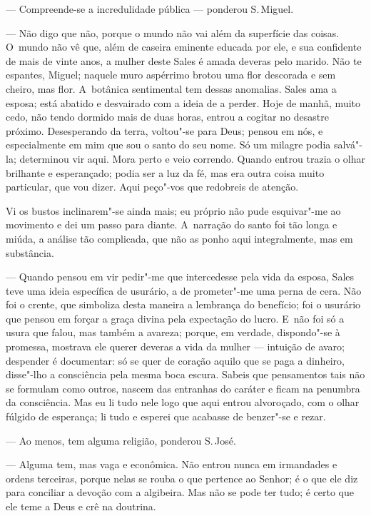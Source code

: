 \begin{linenumbers}
--- Compreende-se a incredulidade pública --- ponderou S.\,Miguel.

--- Não digo que não, porque o mundo não vai além da superfície das
coisas. O~mundo não vê que, além de caseira eminente educada por ele, e
sua confidente de mais de vinte anos, a mulher deste Sales é amada
deveras pelo marido. Não te espantes, Miguel; naquele muro aspérrimo
brotou uma flor descorada e sem cheiro, mas flor. A~botânica sentimental
tem dessas anomalias. Sales ama a esposa; está abatido e desvairado com
a ideia de a perder. Hoje de manhã, muito cedo, não tendo dormido mais
de duas horas, entrou a cogitar no desastre próximo. Desesperando da
terra, voltou"-se para Deus; pensou em nós, e especialmente em mim que
sou o santo do seu nome. Só um milagre podia salvá"-la; determinou vir
aqui. Mora perto e veio correndo. Quando entrou trazia o olhar brilhante
e esperançado; podia ser a luz da fé, mas era outra coisa muito
particular, que vou dizer. Aqui peço"-vos que redobreis de atenção.

Vi os bustos inclinarem"-se ainda mais; eu próprio não pude esquivar"-me
ao movimento e dei um passo para diante. A~narração do santo foi tão
longa e miúda, a análise tão complicada, que não as ponho aqui
integralmente, mas em substância.

--- Quando pensou em vir pedir"-me que intercedesse pela vida da esposa,
Sales teve uma ideia específica de usurário, a de prometer"-me uma perna
de cera. Não foi o crente, que simboliza desta maneira a lembrança do
benefício; foi o usurário que pensou em forçar a graça divina pela
expectação do lucro. E~não foi só a usura que falou, mas também a
avareza; porque, em verdade, dispondo"-se à promessa, mostrava ele querer
deveras a vida da mulher --- intuição de avaro; despender é documentar:
só se quer de coração aquilo que se paga a dinheiro, disse"-lho a
consciência pela mesma boca escura. Sabeis que pensamentos tais não se
formulam como outros, nascem das entranhas do caráter e ficam na
penumbra da consciência. Mas eu li tudo nele logo que aqui entrou
alvoroçado, com o olhar fúlgido de esperança; li tudo e esperei que
acabasse de benzer"-se e rezar.

--- Ao menos, tem alguma religião, ponderou S.\,José.

--- Alguma tem, mas vaga e econômica. Não entrou nunca em irmandades e
ordens terceiras, porque nelas se rouba o que pertence ao Senhor; é o
que ele diz para conciliar a devoção com a algibeira. Mas não se pode
ter tudo; é certo que ele teme a Deus e crê na doutrina.


\end{linenumbers}
